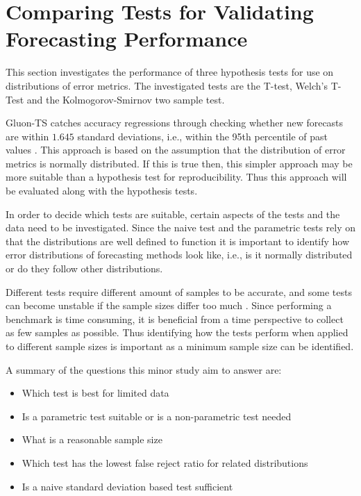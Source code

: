 \section{Comparing Tests for Validating Forecasting Performance}
\label{sec:compairing_hypothesis_tests}
This section investigates the performance of three hypothesis tests for use on distributions of error metrics. The investigated tests are the T-test, Welch’s T-Test and the Kolmogorov-Smirnov two sample test.

Gluon-TS catches accuracy regressions through checking whether new forecasts are within \(1.645\) standard deviations, i.e., within the 95th percentile of past values \cite{gluonts-github}. This approach is based on the assumption that the distribution of error metrics is normally distributed. If this is true then, this simpler approach may be more suitable than a hypothesis test for reproducibility. Thus this approach will be evaluated along with the hypothesis tests.

In order to decide which tests are suitable, certain aspects of the tests and the data need to be investigated. Since the naive test and the parametric tests rely on that the distributions are well defined to function it is important to identify how error distributions of forecasting methods look like, i.e., is it normally distributed or do they follow other distributions.

Different tests require different amount of samples to be accurate, and some tests can become unstable if the sample sizes differ too much \cite{hassani2015kolmogorov, student_or_welch}. Since performing a benchmark is time consuming, it is beneficial from a time perspective to collect as few samples as possible. Thus identifying how the tests perform when applied to different sample sizes is important as a minimum sample size can be identified.

A summary of the questions this minor study aim to answer are:

\begin{itemize}
  \item Which test is best for limited data
  \item Is a parametric test suitable or is a non-parametric test needed
  \item What is a reasonable sample size
  \item Which test has the lowest false reject ratio for related distributions
  \item Is a naive standard deviation based test sufficient
\end{itemize}



